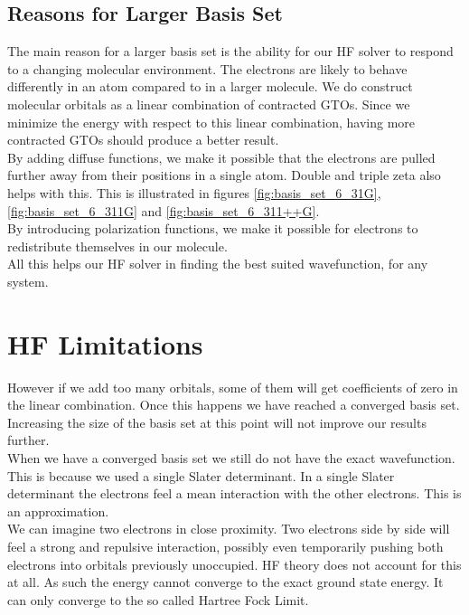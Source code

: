 \documentclass[a4paper,norsk,11pt,twoside]{report}
\begin{document}
\subsection{Reasons for Larger Basis Set}
The main reason for a larger basis set is the ability for our HF
solver to respond to a changing molecular environment. The electrons
are likely to behave differently in an atom  compared to in a
larger molecule. We do construct molecular orbitals as a linear
combination of contracted GTOs. Since we minimize the energy with
respect to this linear combination, having more contracted GTOs should
produce a better result. \\

By adding diffuse functions, we make it possible that the electrons
are pulled further away from their positions in a single atom. Double and
triple zeta also helps with this. This is illustrated in figures
\ref{fig:basis_set_6_31G}, \ref{fig:basis_set_6_311G} and
\ref{fig:basis_set_6_311++G}. \\

By introducing polarization functions, we make it possible for
electrons to redistribute themselves in our molecule.  \\

All this helps our HF solver in finding the best suited wavefunction, for any system.

\section{HF Limitations \label{imporatant_ccsd_convergence_ting}}
However if we add too many orbitals, some of them will get coefficients
of zero in the linear combination. Once this happens we have reached a
converged basis set. Increasing the size of the basis set at this
point will not improve our results further. \\

When we have a converged basis set we still do not have the exact
wavefunction. This is because we used a single Slater determinant. In
a single Slater determinant the electrons feel a mean interaction with
the other electrons. This is an approximation. \\

We can imagine two electrons in close proximity. Two electrons side by
side will feel a strong and repulsive interaction, possibly even temporarily pushing
both electrons into orbitals previously unoccupied. HF theory does not
account for this at all. As such the energy cannot converge to the
exact ground state energy. It can only converge to the so called
Hartree Fock Limit. \\
\end{document}
